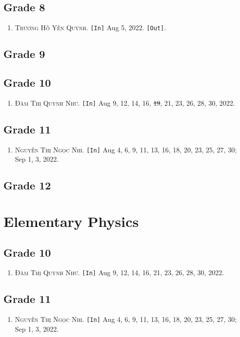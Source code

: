 \documentclass{article}
\numberwithin{equation}{section}
\begin{document}
\subsection{Grade 8}
\begin{enumerate}
	\item \textsc{Trương Hồ Yến Quỳnh.} \texttt{[In]} Aug 5, 2022. \texttt{[Out]}.
\end{enumerate}

\subsection{Grade 9}

\subsection{Grade 10}
\begin{enumerate}
	\item \textsc{Đàm Thị Quỳnh Như.} \texttt{[In]} Aug 9, 12, 14, 16, \st{19}, 21, 23, 26, 28, 30, 2022.
\end{enumerate}

\subsection{Grade 11}
\begin{enumerate}
	\item \textsc{Nguyễn Thị Ngọc Nhi.} \texttt{[In]} Aug 4, 6, 9, 11, 13, 16, 18, 20, 23, 25, 27, 30; Sep 1, 3, 2022.
\end{enumerate}

\subsection{Grade 12}

\section{Elementary Physics}

\subsection{Grade 10}
\begin{enumerate}
	\item \textsc{Đàm Thị Quỳnh Như.} \texttt{[In]} Aug 9, 12, 14, 16, 21, 23, 26, 28, 30, 2022.
\end{enumerate}

\subsection{Grade 11}
\begin{enumerate}
	\item \textsc{Nguyễn Thị Ngọc Nhi.} \texttt{[In]} Aug 4, 6, 9, 11, 13, 16, 18, 20, 23, 25, 27, 30; Sep 1, 3, 2022.
\end{enumerate}
\end{document}
